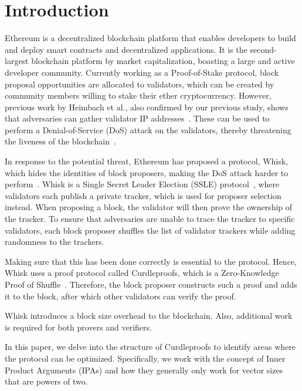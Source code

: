

\section{Introduction}\label{sec:introduction}
Ethereum is a decentralized blockchain platform that enables developers to build and deploy smart contracts and decentralized applications.
It is the second-largest blockchain platform by market capitalization, boasting a large and active developer community.
Currently working as a Proof-of-Stake protocol, block proposal opportunities are allocated to validators, which can be created by community members willing to stake their ether cryptocurrency.
However, previous work by Heimbach et al., also confirmed by our previous study, shows that adversaries can gather validator IP addresses~\cite{heimbach2024deanonymizingethereumvalidatorsp2p, ouroldpaper}.
These can be used to perform a Denial-of-Service (DoS) attack on the validators, thereby threatening the liveness of the blockchain~\cite{EthereumAttackDefense2024, ouroldpaper}.

In response to the potential threat, Ethereum has proposed a protocol, Whisk, which hides the identities of block proposers, making the DoS attack harder to perform~\cite{Whisk2024}.
Whisk is a Single Secret Leader Election (SSLE) protocol~\cite{10.1145/3419614.3423258}, where validators each publish a private tracker, which is used for proposer selection instead.
When proposing a block, the validator will then prove the ownership of the tracker.
To ensure that adversaries are unable to trace the tracker to specific validators, each block proposer shuffles the list of validator trackers while adding randomness to the trackers.

Making sure that this has been done correctly is essential to the protocol.
Hence, Whisk uses a proof protocol called Curdleproofs, which is a Zero-Knowledge Proof of Shuffle~\cite{Curdleproofs}.
Therefore, the block proposer constructs such a proof and adds it to the block, after which other validators can verify the proof.

Whisk introduces a block size overhead to the blockchain.
Also, additional work is required for both provers and verifiers.

In this paper, we delve into the structure of Curdleproofs to identify areas where the protocol can be optimized.
Specifically, we work with the concept of Inner Product Arguments (IPAs) and how they generally only work for vector sizes that are powers of two.

